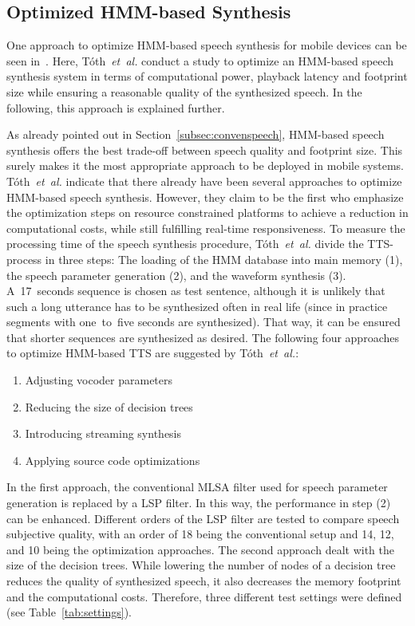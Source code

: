 \subsection{Optimized \ac{HMM}-based Synthesis}
\label{subsec:hmmembedded}

One approach to optimize \ac{HMM}-based speech synthesis for mobile devices can be seen in~\cite{toth:optimizing}. Here, T\'oth~\textit{et~al.} conduct a study to optimize an \ac{HMM}-based speech synthesis system in terms of computational power, playback latency and footprint size while ensuring a reasonable quality of the synthesized speech. In the following, this approach is explained further.

As already pointed out in Section~\ref{subsec:convenspeech}, \ac{HMM}-based speech synthesis offers the best trade-off between speech quality and footprint size. This surely makes it the most appropriate approach to be deployed in mobile systems. T\'oth~\textit{et~al.} indicate that there already have been several approaches to optimize \ac{HMM}-based speech synthesis. However, they claim to be the first who emphasize the optimization steps on resource constrained platforms to achieve a reduction in computational costs, while still fulfilling real-time responsiveness. To measure the processing time of the speech synthesis procedure, T\'oth~\textit{et~al.} divide the \ac{TTS}-process in three steps: The loading of the \ac{HMM} database into main memory (1), the speech parameter generation (2), and the waveform synthesis (3). A~17~seconds sequence is chosen as test sentence, although it is unlikely that such a long utterance has to be synthesized often in real life (since in practice segments with one~to~five seconds are synthesized). That way, it can be ensured that shorter sequences are synthesized as desired. The following four approaches to optimize \ac{HMM}-based \ac{TTS} are suggested by T\'oth~\textit{et~al.}:

\begin{enumerate}[label=\Alph*)]		%
	\parskip0.25em
	\bfseries
	\item Adjusting vocoder parameters
	\item Reducing the size of decision trees
	\item Introducing streaming synthesis
	\item Applying source code optimizations
\end{enumerate}

In the first approach, the conventional \ac{MLSA} filter used for speech parameter generation is replaced by a \ac{LSP} filter. In this way, the performance in step (2) can be enhanced. Different orders of the \ac{LSP} filter are tested to compare speech subjective quality, with an order of 18 being the conventional setup and 14, 12, and 10 being the optimization approaches. The second approach dealt with the size of the decision trees. While lowering the number of nodes of a decision tree reduces the quality of synthesized speech, it also decreases the memory footprint and the computational costs. Therefore, three different test settings were defined (see Table~\ref{tab:settings}).

